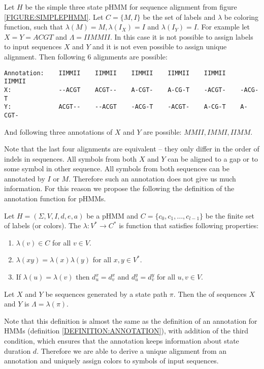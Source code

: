 Let $H$ be the simple  three state pHMM for sequence alignment from figure
\ref{FIGURE:SIMPLEPHMM}. Let $C=\{M,I\}$ be the set of labels and $\lambda$ be
coloring function, such that $\lambda(M)=M, \lambda(I_X)=I$ and
$\lambda(I_Y)=I$.   For example let $X=Y=ACGT$ and $\Lambda = IIMMII$.  In this
case it is not possible to assign labels to input sequences $X$ and
$Y$ and it is not even possible to assign unique alignment.  Then following $6$
alignments are possible:
\begin{verbatim}
Annotation:    IIMMII    IIMMII    IIMMII    IIMMII    IIMMII    IIMMII
X:             --ACGT    ACGT--    A-CGT-    A-CG-T    -ACGT-    -ACG-T
Y:             ACGT--    --ACGT    -ACG-T    -ACGT-    A-CG-T    A-CGT-
\end{verbatim}
And following three annotations of $X$ and $Y$ are possible: $MMII,IMMI,IIMM$.

Note that the last four  alignments are equivalent -- they only differ in the order
of indels in sequences. All symbols from both $X$ and $Y$ can be aligned to a gap
or to some symbol in other sequence. All symbols from both sequences can be
annotated by $I$ or $M$. Therefore such an annotation does not give us much
information.
For this reason we propose the following the definition of the annotation
function for  pHMMs.

\begin{definition}
Let $H=(\Sigma,V,I,d,e,a)$ be a pHMM and $C=\{c_0,c_1,\dots,c_{l-1}\}$ be the
finite set of labels (or colors). The 
$\lambda:V^*\to C^*$ is function that satisfies following properties: 
\begin{enumerate}
\item $\lambda(v)\in C$ for all $v\in V$.
\item $\lambda(xy) = \lambda(x)\lambda(y)$ for all $x,y\in V^*$.
\item If $\lambda(u)=\lambda(v)$ then $d^x_u=d^x_v$ and $d^y_u=d^y_v$ for all
$u,v\in V$.
\end{enumerate}
Let $X$ and $Y$ be sequences generated by a state path $\pi$. Then the
 of sequences $X$ and $Y$ is 
$\Lambda=\lambda(\pi)$.
\end{definition}

Note that this definition is almost the same as the definition of an annotation
for HMMs (definition \ref{DEFINITION:ANNOTATION}),  
with addition of the  third condition, which ensures that
the annotation keeps information about state duration $d$. Therefore we are able to
derive a unique alignment from an annotation and uniquely assign colors to symbols of
input sequences.

